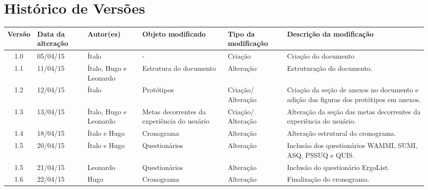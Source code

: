 \chapter{Histórico de Versões}

\begin{longtable}{|c|m{2cm}|m{2.8cm}|m{2.3cm}|m{2.44cm}|m{4.2cm}|}

  \hline
  \textbf{Versão} & \textbf{Data da alteração} & \textbf{Autor(es)} & \textbf{Objeto modificado} & \textbf{Tipo da modificação} & \textbf{Descrição da modificação}\\
  
  \hline                               
  1.0 & 05/04/15 & Ítalo & - & Criação & Criação do documento\\
  
  \hline                               
  1.1 & 11/04/15 & Ítalo, Hugo e Leonardo & Estrutura do documento & Alteração & Estruturação do documento.\\
  
  \hline                               
  1.2 & 12/04/15 & Ítalo & Protótipos & Criação/ Alteração & Criação da seção de anexos no documento e adição das figuras dos protótipos em anexos.\\
 
  \hline                               
  1.3 & 13/04/15 & Ítalo, Hugo e Leonardo & Metas decorrentes da experiência do usuário & Criação/ Alteração & Alteração da seção das metas decorrentes da experiência do usuário.\\
 
  \hline                               
  1.4 & 18/04/15 & Ítalo e Hugo & Cronograma & Alteração & Alteração estrutural do cronograma.\\
 
  \hline                               
  1.5 & 20/04/15 & Ítalo e Hugo & Questionários & Alteração & Inclusão dos questionários WAMMI, SUMI, ASQ, PSSUQ e QUIS.\\
 
  \hline                               
  1.5 & 21/04/15 & Leonardo & Questionários & Alteração & Inclusão do questionário ErgoList.\\
 
  \hline                               
  1.6 & 22/04/15 & Hugo & Cronograma & Alteração & Finalização do cronograma.\\
  

\end{longtable}
